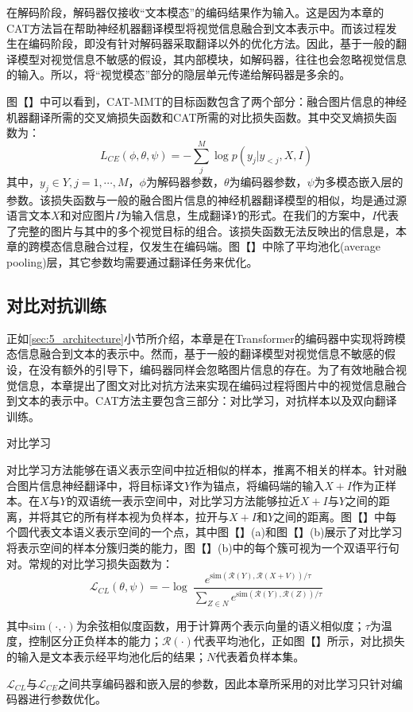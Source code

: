 在解码阶段，解码器仅接收“文本模态”的编码结果作为输入。这是因为本章的CAT方法旨在帮助神经机器翻译模型将视觉信息融合到文本表示中。而该过程发生在编码阶段，即没有针对解码器采取翻译以外的优化方法。因此，基于一般的翻译模型对视觉信息不敏感的假设，其内部模块，如解码器，往往也会忽略视觉信息的输入。所以，将“视觉模态”部分的隐层单元传递给解码器是多余的。

图【】中可以看到，CAT-MMT的目标函数包含了两个部分：融合图片信息的神经机器翻译所需的交叉熵损失函数和CAT所需的对比损失函数。其中交叉熵损失函数为：
\begin{equation}
    L_{CE}(\phi, \theta, \psi)=-\sum_j^M \log p(y_j|y_{<j},X,I)
\label{eq:5_cross_entropy}
\end{equation}
其中，$y_j \in Y,j=1,\cdots,M$，$\phi$为解码器参数，$\theta$为编码器参数，$\psi$为多模态嵌入层的参数。该损失函数与一般的融合图片信息的神经机器翻译模型的相似，均是通过源语言文本$X$和对应图片$I$为输入信息，生成翻译$Y$的形式。在我们的方案中，$I$代表了完整的图片与其中的多个视觉目标的组合。该损失函数无法反映出的信息是，本章的跨模态信息融合过程，仅发生在编码端。图【】中除了平均池化(average pooling)层，其它参数均需要通过翻译任务来优化。

\subsection{对比对抗训练}
\label{sec:5_cat}
正如\ref{sec:5_architecture}小节所介绍，本章是在Transformer的编码器中实现将跨模态信息融合到文本的表示中。然而，基于一般的翻译模型对视觉信息不敏感的假设，在没有额外的引导下，编码器同样会忽略图片信息的存在。为了有效地融合视觉信息，本章提出了图文对比对抗方法来实现在编码过程将图片中的视觉信息融合到文本的表示中。CAT方法主要包含三部分：对比学习，对抗样本以及双向翻译训练。

{\sffamily 对比学习}

对比学习方法能够在语义表示空间中拉近相似的样本，推离不相关的样本。针对融合图片信息神经翻译中，将目标译文$Y$作为锚点，将编码端的输入$X+I$作为正样本。在$X$与$Y$的双语统一表示空间中，对比学习方法能够拉近$X+I$与$Y$之间的距离，并将其它的所有样本视为负样本，拉开与$X+I$和$Y$之间的距离。图【】中每个圆代表文本语义表示空间的一个点，其中图【】(a)和图【】(b)展示了对比学习将表示空间的样本分簇归类的能力，图【】(b)中的每个簇可视为一个双语平行句对。常规的对比学习损失函数为：
\begin{equation}
    \mathcal{L}_{CL}(\theta, \psi)=-\log\ \frac{e^{\mathrm{sim}(\mathcal{R}(Y),\mathcal{R}(X+V))/\tau}}{\sum_{Z\in N}e^{\mathrm{sim}(\mathcal{R}(Y),\mathcal{R}(Z))/\tau}}
    \label{eq:5_contrastive_learning}
\end{equation}

其中$\mathrm{sim}(\cdot,\cdot)$为余弦相似度函数，用于计算两个表示向量的语义相似度；$\tau$为温度，控制区分正负样本的能力；$\mathcal{R}(\cdot)$代表平均池化，正如图【】所示，对比损失的输入是文本表示经平均池化后的结果；$N$代表着负样本集。

$\mathcal{L}_{CL}$与$\mathcal{L}_{CE}$之间共享编码器和嵌入层的参数，因此本章所采用的对比学习只针对编码器进行参数优化。